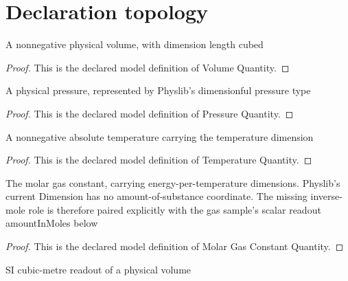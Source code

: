 \section{Declaration topology}
\begin{definition}
  \label{def:physics:phyx-mini-0369:phyxminiproblems-problemphyxmini0369-volumequantity}
  A nonnegative physical volume, with dimension length cubed
\end{definition}
\begin{proof}
  This is the declared model definition of Volume Quantity.
\end{proof}
\begin{definition}
  \label{def:physics:phyx-mini-0369:phyxminiproblems-problemphyxmini0369-pressurequantity}
  A physical pressure, represented by Physlib's dimensionful pressure type
\end{definition}
\begin{proof}
  This is the declared model definition of Pressure Quantity.
\end{proof}
\begin{definition}
  \label{def:physics:phyx-mini-0369:phyxminiproblems-problemphyxmini0369-temperaturequantity}
  A nonnegative absolute temperature carrying the temperature dimension
\end{definition}
\begin{proof}
  This is the declared model definition of Temperature Quantity.
\end{proof}
\begin{definition}
  \label{def:physics:phyx-mini-0369:phyxminiproblems-problemphyxmini0369-molargasconstantquantity}
  The molar gas constant, carrying energy-per-temperature dimensions. Physlib's current Dimension has no amount-of-substance coordinate. The missing inverse-mole role is therefore paired explicitly with the gas sample's scalar readout amountInMoles below
\end{definition}
\begin{proof}
  This is the declared model definition of Molar Gas Constant Quantity.
\end{proof}
\begin{definition}
  \label{def:physics:phyx-mini-0369:phyxminiproblems-problemphyxmini0369-volumeincubicmeters}
  SI cubic-metre readout of a physical volume
\end{definition}
